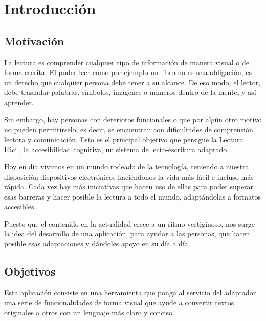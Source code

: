 \chapter{Introducción}
\label{cap:introduccion}


\section{Motivación}

La lectura es comprender cualquier tipo de información de manera visual o de forma escrita. El poder leer como por ejemplo un libro no es una obligación, es un derecho que cualquier persona debe tener a su alcance. De eso modo, el lector, debe trasladar palabras, símbolos, imágenes o números dentro de la mente, y así aprender.

 \setlength{\parskip}{10pt}

 Sin embargo, hay personas con deterioros funcionales o que por algún otro motivo no pueden permitírselo, es decir, se encuentran con dificultades de comprensión lectora y comunicación. Esto es el principal objetivo que persigue la Lectura Fácil, la accesibilidad cognitiva, un sistema de lecto-escritura adaptado.
 
 \setlength{\parskip}{10pt}
 
Hoy en día vivimos en un mundo rodeado de la tecnología, teniendo a nuestra disposición dispositivos electrónicos haciéndonos la vida más fácil e incluso más rápida. Cada vez hay más iniciativas que hacen uso de ellas para poder superar esas barreras y hacer posible la lectura a todo el mundo, adaptándolas a formatos accesibles. 

 \setlength{\parskip}{10pt}
 
Puesto que el contenido en la actualidad crece a un ritmo vertiginoso, nos surge la idea del desarrollo de una aplicación, para ayudar a las personas, que hacen posible esas adaptaciones y dándoles apoyo en su día a día.


\section{Objetivos}
Esta aplicación consiste en una herramienta que ponga al servicio del adaptador una serie de funcionalidades de forma visual que ayude a convertir textos originales a otros con un lenguaje más claro y conciso.


